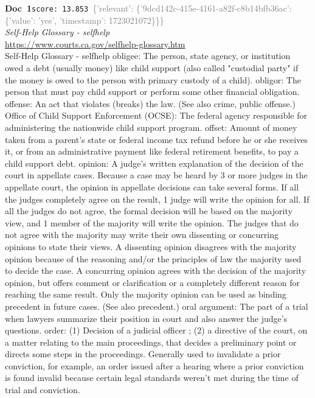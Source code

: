 \documentclass[a4paper,11pt]{article}
\begin{document}
\begin{docenv}
{\footnotesize\textcolor{doccolor}{\textbf{Doc~1}}}\hfill{\tiny\texttt{score:~13.853}}\ {\tiny\textcolor{gray}{\{'relevant': \{'9dcd142c-415e-4161-a82f-c8b14bfb36ac': \{'value': 'yes', 'timestamp': 1723021072\}\}\}}}\\[3pt]
{\small\textit{Self-Help Glossary - selfhelp}}\\[2pt]
{\tiny\url{https://www.courts.ca.gov/selfhelp-glossary.htm}}\\[4pt]
{\footnotesize Self-Help Glossary - selfhelp
obligee: The person, state agency, or institution owed a debt (usually money) like child support (also called "custodial party" if the money is owed to the person with primary custody of a child).
obligor: The person that must pay child support or perform some other financial obligation.
offense: An act that violates (breaks) the law. (See also crime, public offense.)
Office of Child Support Enforcement (OCSE): The federal agency responsible for administering the nationwide child support program.
offset: Amount of money taken from a parent's state or federal income tax refund before he or she receives it, or from an administrative payment like federal retirement benefits, to pay a child support debt.
opinion: A judge's written explanation of the decision of the court in appellate cases. Because a case may be heard by 3 or more judges in the appellate court, the opinion in appellate decisions can take several forms. If all the judges completely agree on the result, 1 judge will write the opinion for all. If all the judges do not agree, the formal decision will be based on the majority view, and 1 member of the majority will write the opinion. The judges that do not agree with the majority may write their own dissenting or concurring opinions to state their views. A dissenting opinion disagrees with the majority opinion because of the reasoning and/or the principles of law the majority used to decide the case. A concurring opinion agrees with the decision of the majority opinion, but offers comment or clarification or a completely different reason for reaching the same result. Only the majority opinion can be used as binding precedent in future cases. (See also precedent.)
oral argument: The part of a trial when lawyers summarize their position in court and also answer the judge's questions.
order: (1) Decision of a judicial officer ; (2) a directive of the court, on a matter relating to the main proceedings, that decides a preliminary point or directs some steps in the proceedings. Generally used to invalidate a prior conviction, for example, an order issued after a hearing where a prior conviction is found invalid because certain legal standards weren't met during the time of trial and conviction.}
\end{docenv}
\end{document}
